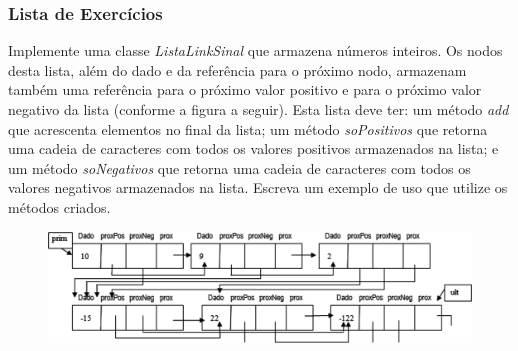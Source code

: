 \documentclass[aspectratio=169]{beamer}
\newcommand\setItemnumber[1]{\setcounter{enumi}{\numexpr#1-1\relax}}
\begin{document}
\begin{frame}[fragile]\frametitle{Lista de Exercícios}
\begin{enumerate}
	\setItemnumber{1}
{\small
	\item Implemente uma classe \emph{ListaLinkSinal} que armazena números inteiros. Os nodos desta lista, além do dado e da referência para o próximo nodo, armazenam também uma referência para o próximo valor positivo e para o próximo valor negativo da lista (conforme a figura a seguir). Esta lista deve ter: um método \emph{add} que acrescenta elementos no final da lista; um método \emph{soPositivos} que retorna uma cadeia de caracteres com todos os valores positivos armazenados na lista; e um método \emph{soNegativos} que retorna uma cadeia de caracteres com todos os valores negativos armazenados na lista. Escreva um exemplo de uso que utilize os métodos criados.
\begin{figure}[h]
	\includegraphics[height=0.35\paperheight]{pucrs-ec-poo-unidade_12-estruturas_encadeadas-laminas-estrutura_encadeada_08.png}
\end{figure}
}
\end{enumerate}
\end{frame}
\end{document}
